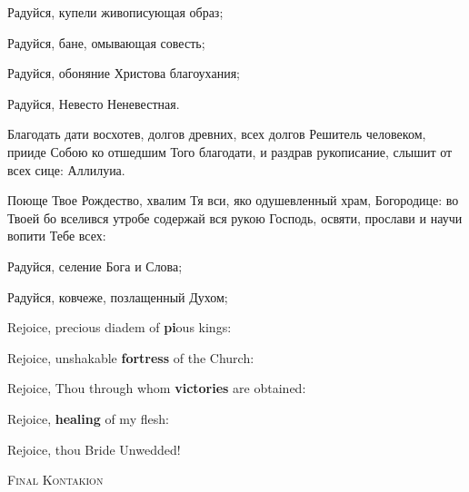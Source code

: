 Радуйся, купели живописующая образ;


Радуйся, бане, омывающая совесть;


Радуйся, обоняние Христова благоухания;


Радуйся, Невесто Неневестная.


\Ierei Благодать дати восхотев, долгов древних, всех долгов Решитель человеком, прииде Собою ко отшедшим Того благодати, и раздрав рукописание, слышит от всех сице: Аллилуиа.


Поюще Твое Рождество, хвалим Тя вси, яко одушевленный храм, Богородице: во Твоей бо вселився утробе содержай вся рукою Господь, освяти, прослави и научи вопити Тебе всех:

Радуйся, селение Бога и Слова;


Радуйся, ковчеже, позлащенный Духом;


\pagebreak



Rejoice, precious diadem of \textbf{pi}ous kings:


Rejoice, unshakable \textbf{fortress} of the Church:


Rejoice, Thou through whom \textbf{victories} are obtained:


Rejoice, \textbf{healing} of my flesh:


Rejoice, thou Bride Unwedded!

{\textsc{\color{Maroon}Final Kontakion}}


